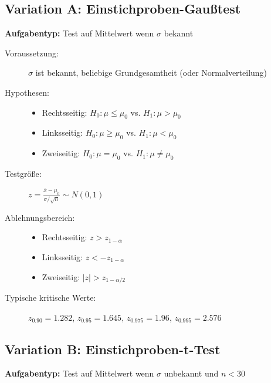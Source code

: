 \documentclass[12pt, a4paper, titlepage, ngerman]{scrartcl}
\begin{document}
\subsection{Variation A: Einstichproben-Gaußtest}

\textbf{Aufgabentyp:} Test auf Mittelwert wenn $\sigma$ bekannt

\begin{description}
  \item[Voraussetzung:] $\sigma$ ist bekannt, beliebige Grundgesamtheit (oder Normalverteilung)
  \item[Hypothesen:] 
    \begin{itemize}
      \item Rechtsseitig: $H_0: \mu \leq \mu_0$ vs. $H_1: \mu > \mu_0$
      \item Linksseitig: $H_0: \mu \geq \mu_0$ vs. $H_1: \mu < \mu_0$
      \item Zweiseitig: $H_0: \mu = \mu_0$ vs. $H_1: \mu \neq \mu_0$
    \end{itemize}
  \item[Testgröße:] $z = \frac{\overline{x} - \mu_0}{\sigma/\sqrt{n}} \sim N(0,1)$
  \item[Ablehnungsbereich:] 
    \begin{itemize}
      \item Rechtsseitig: $z > z_{1-\alpha}$
      \item Linksseitig: $z < -z_{1-\alpha}$
      \item Zweiseitig: $|z| > z_{1-\alpha/2}$
    \end{itemize}
  \item[Typische kritische Werte:] $z_{0.90} = 1.282$, $z_{0.95} = 1.645$, $z_{0.975} = 1.96$, $z_{0.995} = 2.576$
\end{description}

\subsection{Variation B: Einstichproben-t-Test}

\textbf{Aufgabentyp:} Test auf Mittelwert wenn $\sigma$ unbekannt und $n < 30$
\end{document}
